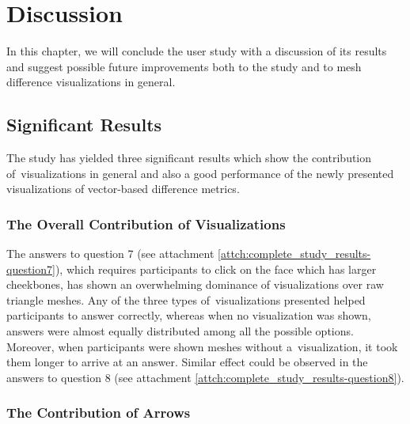\chapter{Discussion}
\label{chap:discussion}

In this chapter, we will conclude the user study with a discussion of its results and suggest possible future improvements both to the study and to mesh difference visualizations in general.

\section{Significant Results}
\label{sec:discussion-sig_results}

The study has yielded three significant results which show the contribution of~visualizations in general and also a good performance of the newly presented visualizations of vector-based difference metrics.

\subsection{The Overall Contribution of Visualizations}
\label{subsec:discussion-sig_results-overall_contrib}

The answers to question 7 (see attachment \ref{attch:complete_study_results-question7}), which requires participants to click on the face which has larger cheekbones, has shown an overwhelming dominance of visualizations over raw triangle meshes. Any of the three types of~visualizations presented helped participants to answer correctly, whereas when no visualization was shown, answers were almost equally distributed among all the possible options. Moreover, when participants were shown meshes without a~visualization, it took them longer to arrive at an answer. Similar effect could be observed in the answers to question 8 (see attachment \ref{attch:complete_study_results-question8}).

\subsection{The Contribution of Arrows}
\label{subsec:discussion-sig_results-arrow_contrib}

